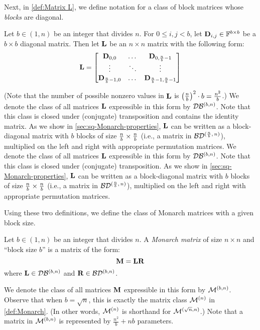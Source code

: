 Next, in \cref{def:Matrix L}, we define notation for a class of block matrices whose \emph{blocks} are diagonal.

\begin{definition}
\label{def:Matrix L}
Let $b \in (1, n)$ be an integer that divides $n$. For $0 \le i, j < b$, let $\mathbf{D}_{i,j}\in\mathbb{F}^{b\times b}$ be a $b \times b$ diagonal matrix.
Then let $\mathbf{L}$ be an $n \times n$ matrix with the following form: 
    \begin{equation}
        	\label{eq:def-L}
    \mathbf{L}=
    	\begin{bmatrix}
    		\mathbf{D}_{0,0} & \dots & \mathbf{D}_{0,\frac{n}{b} -1} \\
    		\vdots & \ddots & \vdots \\
    		\mathbf{D}_{\frac{n}{b} -1,0} & \dots & \mathbf{D}_{\frac{n}{b} -1,\frac{n}{b} -1}
    	\end{bmatrix}
    \end{equation}
\end{definition}
(Note that the number of possible nonzero values in $\mathbf{L}$ is $\left( {\frac nb}\right)^2\cdot b=\frac{n^2}b$.)
We denote the class of all matrices $\mathbf{L}$ expressible in this form by $\mathcal{D}\mathcal{B}^{(b, n)}$. Note that this class is closed under (conjugate) transposition and contains the identity matrix. As we show in \cref{sec:sq-Monarch-properties}, $\mathbf{L}$ can be written as a block-diagonal matrix with $b$ blocks of size $\tfrac{n}{b} \times \tfrac{n}{b}$ (i.e., a matrix in $\mathcal{B}\mathcal{D}^{(\frac{n}{b}, \, n)}$), multiplied on the left and right with appropriate permutation matrices.
We denote the class of all matrices $\mathbf{L}$ expressible in this form by $\mathcal{D}\mathcal{B}^{(b, n)}$. Note that this class is closed under (conjugate) transposition. As we show in \cref{sec:sq-Monarch-properties}, $\mathbf{L}$ can be written as a block-diagonal matrix with $b$ blocks of size $\tfrac{n}{b} \times \tfrac{n}{b}$ (i.e., a matrix in $\mathcal{B}\mathcal{D}^{(\frac{n}{b}, \, n)}$), multiplied on the left and right with appropriate permutation matrices.

Using these two definitions, we define the class of Monarch matrices with a given block size.
\begin{definition}
\label{def:block_Monarch}
Let $b \in (1, n)$ be an integer that divides $n$. A \emph{Monarch matrix} of size $n \times n$ and ``block size $b$'' is a matrix of the form: 
    \begin{equation}
        	\label{eq:Monarch-general}
    \mathbf{M}= \mathbf{L} \mathbf{R}
    \end{equation}
    where $\mathbf{L} \in \mathcal{D}\mathcal{B}^{(b,n)}$ and $\mathbf{R} \in \mathcal{B}\mathcal{D}^{(b,n)}$.
\end{definition}
We denote the class of all matrices $\mathbf{M}$ expressible in this form by $\mathcal{M}^{(b, n)}$. Observe that when $b = \sqrt{n}$, this is exactly the matrix class $\mathcal{M}^{(n)}$ in \cref{def:Monarch}. (In other words, $\mathcal{M}^{(n)}$ is shorthand for $\mathcal{M}^{(\sqrt{n}, n)}$.) Note that a matrix in $\mathcal{M}^{(b,n)}$ is represented by $\frac{n^2}{b} + nb$ parameters.

